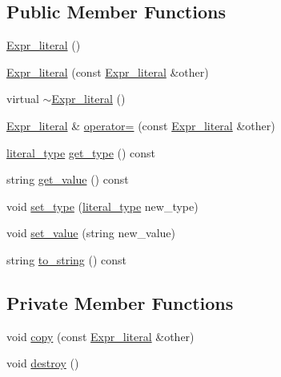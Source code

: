 \subsection*{Public Member Functions}
\begin{DoxyCompactItemize}
\item 
\hyperlink{classgenevalmag_1_1Expr__literal_aad56a6d5a1929c03b3c19ac10f06bf73}{Expr\_\-literal} ()
\item 
\hyperlink{classgenevalmag_1_1Expr__literal_ad8dff199ac5faaa7808b24bc6e99aa84}{Expr\_\-literal} (const \hyperlink{classgenevalmag_1_1Expr__literal}{Expr\_\-literal} \&other)
\item 
virtual \hyperlink{classgenevalmag_1_1Expr__literal_afaa929f1cd65a7486a29e4d110c73f89}{$\sim$Expr\_\-literal} ()
\item 
\hyperlink{classgenevalmag_1_1Expr__literal}{Expr\_\-literal} \& \hyperlink{classgenevalmag_1_1Expr__literal_a76f4c6a1fd0fe094b929d6e01868e0ed}{operator=} (const \hyperlink{classgenevalmag_1_1Expr__literal}{Expr\_\-literal} \&other)
\item 
\hyperlink{namespacegenevalmag_a054e5e9167597919bb2fe12ba999fb31}{literal\_\-type} \hyperlink{classgenevalmag_1_1Expr__literal_ae821eeb6e591dfe1d8ee62a38367618e}{get\_\-type} () const 
\item 
string \hyperlink{classgenevalmag_1_1Expr__literal_a80638840b211284c6d4b4babbe08ce21}{get\_\-value} () const 
\item 
void \hyperlink{classgenevalmag_1_1Expr__literal_a6a09dcb9f4c693c55b30ead8b70477fe}{set\_\-type} (\hyperlink{namespacegenevalmag_a054e5e9167597919bb2fe12ba999fb31}{literal\_\-type} new\_\-type)
\item 
void \hyperlink{classgenevalmag_1_1Expr__literal_af5e0c53c8df7f902540387c4ff6912e7}{set\_\-value} (string new\_\-value)
\item 
string \hyperlink{classgenevalmag_1_1Expr__literal_a2e023f432f0a46b75f65cb0e36ac6583}{to\_\-string} () const 
\end{DoxyCompactItemize}
\subsection*{Private Member Functions}
\begin{DoxyCompactItemize}
\item 
void \hyperlink{classgenevalmag_1_1Expr__literal_aab439489dbf96ebac5c518277a681698}{copy} (const \hyperlink{classgenevalmag_1_1Expr__literal}{Expr\_\-literal} \&other)
\item 
void \hyperlink{classgenevalmag_1_1Expr__literal_a81c4aedbe32ef9a69e5a63d7387d9dbf}{destroy} ()
\end{DoxyCompactItemize}
